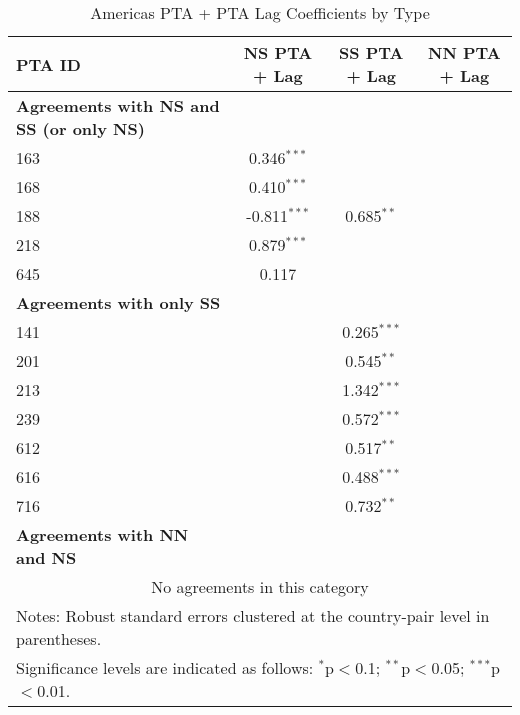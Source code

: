 \begin{table}[htbp]
    \centering
    \caption{Americas PTA + PTA Lag Coefficients by Type}
    \label{tab:americas_pta}
    \begin{adjustbox}{max width=\textwidth}
    \begin{tabular}{lccc}
    \hline
    \textbf{PTA ID} & \textbf{NS PTA + Lag} & \textbf{SS PTA + Lag} & \textbf{NN PTA + Lag} \\
    \hline
    \textbf{Agreements with NS and SS (or only NS)} &  &  &  \\
    \hline
    163 & 0.346$^{\ast\ast\ast}$ &  &  \\
    168 & 0.410$^{\ast\ast\ast}$ &  &  \\
    188 & -0.811$^{\ast\ast\ast}$ & 0.685$^{\ast\ast}$ &  \\
    218 & 0.879$^{\ast\ast\ast}$ &  &  \\
    645 & 0.117 &  &  \\
    \hline
    \textbf{Agreements with only SS} &  &  &  \\
    \hline
    141 &  & 0.265$^{\ast\ast\ast}$ &  \\
    201 &  & 0.545$^{\ast\ast}$ &  \\
    213 &  & 1.342$^{\ast\ast\ast}$ &  \\
    239 &  & 0.572$^{\ast\ast\ast}$ &  \\
    612 &  & 0.517$^{\ast\ast}$ &  \\
    616 &  & 0.488$^{\ast\ast\ast}$ &  \\
    716 &  & 0.732$^{\ast\ast}$ &  \\
    \hline
    \textbf{Agreements with NN and NS} &  &  &  \\
    \hline
    \multicolumn{4}{c}{No agreements in this category} \\
    \hline
    \multicolumn{4}{l}{\footnotesize{Notes: Robust standard errors clustered at the country-pair level in parentheses.}} \\
    \multicolumn{4}{l}{\footnotesize{Significance levels are indicated as follows: $^{\ast}$p$<$0.1; $^{\ast\ast}$p$<$0.05; $^{\ast\ast\ast}$p$<$0.01.}} \\
    \end{tabular}
    \end{adjustbox}
\end{table}
